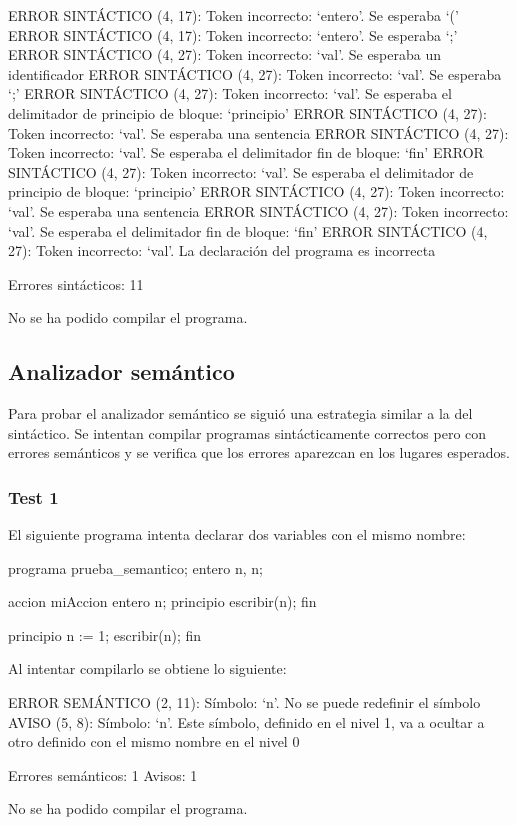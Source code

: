 \begin{codigo}
ERROR SINTÁCTICO (4, 17): Token incorrecto: `entero'. Se esperaba `('
ERROR SINTÁCTICO (4, 17): Token incorrecto: `entero'. Se esperaba `;'
ERROR SINTÁCTICO (4, 27): Token incorrecto: `val'. Se esperaba un identificador
ERROR SINTÁCTICO (4, 27): Token incorrecto: `val'. Se esperaba `;'
ERROR SINTÁCTICO (4, 27): Token incorrecto: `val'. Se esperaba el delimitador de principio de bloque: `principio'
ERROR SINTÁCTICO (4, 27): Token incorrecto: `val'. Se esperaba una sentencia
ERROR SINTÁCTICO (4, 27): Token incorrecto: `val'. Se esperaba el delimitador fin de bloque: `fin'
ERROR SINTÁCTICO (4, 27): Token incorrecto: `val'. Se esperaba el delimitador de principio de bloque: `principio'
ERROR SINTÁCTICO (4, 27): Token incorrecto: `val'. Se esperaba una sentencia
ERROR SINTÁCTICO (4, 27): Token incorrecto: `val'. Se esperaba el delimitador fin de bloque: `fin'
ERROR SINTÁCTICO (4, 27): Token incorrecto: `val'. La declaración del programa es incorrecta

Errores sintácticos: 11

No se ha podido compilar el programa.
\end{codigo}

\subsection{Analizador semántico}
Para probar el analizador semántico se siguió una estrategia similar a la del sintáctico. Se intentan compilar programas sintácticamente correctos pero con errores semánticos y se verifica que los errores aparezcan en los lugares esperados.

\subsubsection{Test 1}
El siguiente programa intenta declarar dos variables con el mismo nombre:

\begin{codigo}[style=minileng,numbers=left]
programa prueba_semantico;
entero n, n;

    accion miAccion
    entero n;
    principio
        escribir(n);
    fin

principio
    n := 1;
    escribir(n);
fin
\end{codigo}

Al intentar compilarlo se obtiene lo siguiente:

\begin{codigo}
ERROR SEMÁNTICO (2, 11): Símbolo: `n'. No se puede redefinir el símbolo
AVISO (5, 8): Símbolo: `n'. Este símbolo, definido en el nivel 1, va a ocultar a otro definido con el mismo nombre en el nivel 0

Errores semánticos: 1
Avisos: 1

No se ha podido compilar el programa.
\end{codigo}

